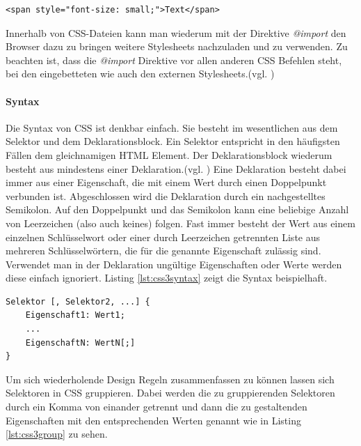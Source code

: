 \documentclass[12pt,a4paper,bibliography=totocnumbered,listof=totocnumbered]{scrartcl}
\begin{document}
	\vspace{1em}
	\begin{lstlisting}[caption=Stylesheet Einbindung in \textit{html}-Element, label=lst:css3einbindunghtml]
<span style="font-size: small;">Text</span>
	\end{lstlisting}
	
Innerhalb von CSS-Dateien kann man wiederum mit der Direktive \textit{@import} den Browser dazu zu bringen weitere Stylesheets nachzuladen und zu verwenden. Zu beachten ist, dass die \textit{@import} Direktive vor allen anderen CSS Befehlen steht, bei den eingebetteten wie auch den externen Stylesheets.(vgl. \cite[S.20]{MeyeCasc2005})

\paragraph{Syntax} Die Syntax von CSS ist denkbar einfach. Sie besteht im wesentlichen aus dem Selektor und dem Deklarationsblock. Ein Selektor entspricht in den häufigsten Fällen dem gleichnamigen HTML Element. Der Deklarationsblock wiederum besteht aus mindestens einer Deklaration.(vgl. \cite[S.26]{MeyeCasc2005}) \glqq Eine Deklaration besteht dabei immer aus einer Eigenschaft, die mit einem Wert durch einen Doppelpunkt verbunden ist. Abgeschlossen wird die Deklaration durch ein nachgestelltes Semikolon. Auf den Doppelpunkt und das Semikolon kann eine beliebige Anzahl von Leerzeichen (also auch keines) folgen. Fast immer besteht der Wert aus einem einzelnen Schlüsselwort oder einer durch Leerzeichen getrennten Liste aus mehreren Schlüsselwörtern, die für die genannte Eigenschaft zulässig sind.\grqq{}\cite[S.28]{MeyeCasc2005} Verwendet man in der Deklaration ungültige Eigenschaften oder Werte werden diese einfach ignoriert. Listing \ref{lst:css3syntax} zeigt die Syntax beispielhaft.

	\vspace{1em}
	\begin{lstlisting}[caption=CSS3 Syntax Beispiel, label=lst:css3syntax]
Selektor [, Selektor2, ...] {
    Eigenschaft1: Wert1;
    ...
    EigenschaftN: WertN[;]
}
	\end{lstlisting}

Um sich wiederholende Design Regeln zusammenfassen zu können lassen sich Selektoren in CSS gruppieren. Dabei werden die zu gruppierenden Selektoren durch ein Komma von einander getrennt und dann die zu gestaltenden Eigenschaften mit den entsprechenden Werten genannt wie in Listing \ref{lst:css3group} zu sehen.
\end{document}
